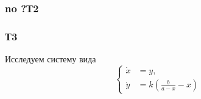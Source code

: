 
\subsubsection*{no ?Т2}


\subsubsection*{Т3}
Исследуем систему вида
\begin{equation*}
    \left\{\begin{aligned}
        \dot{x} &= y, \\
        \dot{y} &= k \left(
            \frac{b}{a-x} - x
        \right)
    \end{aligned}\right.
\end{equation*}








